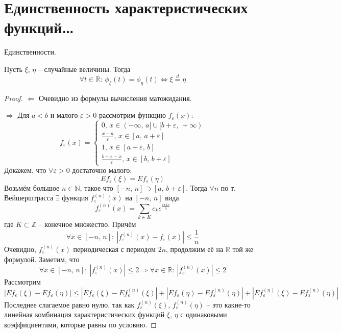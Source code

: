 \section{Единственность характеристических функций\dots}
\begin{theorem}
	Единственности.

	Пусть $\xi,\, \eta$ -- случайные величины. Тогда
	\[\forall t \in \mathbb{R}:\: \phi_\xi(t) = \phi_\eta(t) \Leftrightarrow \xi \stackrel{d}{=} \eta\]
\end{theorem}

\begin{proof}
	$\Leftarrow$ Очевидно из формулы вычисления матожидания.

	$\Rightarrow$ Для $a < b$ и малого $\varepsilon > 0$ рассмотрим функцию $f_\varepsilon(x)$:
	\[
		f_\varepsilon(x) =
		\begin{cases}
			0,\, x \in (-\infty,\, a] \cup [b + \varepsilon,\, +\infty) \\
			\frac{x - a}{\varepsilon},\, x \in [a,\, a + \varepsilon]   \\
			1,\, x \in [a + \varepsilon,\, b]                           \\
			\frac{b + \varepsilon - x}{\varepsilon},\, x \in [b,\, b + \varepsilon]
		\end{cases}
	\]
	Докажем, что $\forall \varepsilon > 0$ достаточно малого:
	\[Ef_\varepsilon(\xi) = Ef_\varepsilon(\eta)\]
	Возьмём большое $n \in \mathbb{N}$, такое что $[-n,\, n] \supset [a,\, b + \varepsilon]$. Тогда $\forall n$ по т. Вейшерштрасса $\exists$ функция $f_\varepsilon^{(n)}(x)$ на $[-n,\,n]$ вида
	\[f_\varepsilon^{(n)}(x) = \sum_{k \in K}c_ke^{\frac{i\pi kx}{n}}\]
	где $K \subset \mathbb{Z}$ -- конечное множество. Причём
	\[\forall x \in [-n,\, n] :\: |f^{(n)}_\varepsilon(x) - f_\varepsilon(x)| \leq \frac{1}{n}\]
	Очевидно, $f^{(n)}_\varepsilon(x)$ периодическая с периодом $2n$, продолжим её на $\mathbb{R}$ той же формулой. Заметим, что
	\[\forall x \in [-n,\,n]:\: |f^{(n)}_\varepsilon(x)| \leq 2 \Rightarrow \forall x \in \mathbb{R}:\: |f^{(n)}_\varepsilon(x)| \leq 2\]
	Рассмотрим
	\[|Ef_\varepsilon(\xi) - Ef_\varepsilon(\eta)| \leq |Ef_\varepsilon(\xi) - Ef^{(n)}_\varepsilon(\xi)| + |Ef_\varepsilon(\eta) - Ef^{(n)}_\varepsilon(\eta)| + |Ef_\varepsilon^{(n)}(\xi) - Ef_\varepsilon^{(n)}(\eta)|\]
	Последнее слагаемое равно нулю, так как $f_\varepsilon^{(n)}(\xi),\, f_\varepsilon^{(n)}(\eta)$ -- это какие-то линейная комбинация характеристических функций $\xi,\, \eta$ с одинаковыми коэффициентами, которые равны по условию.


\end{proof}
